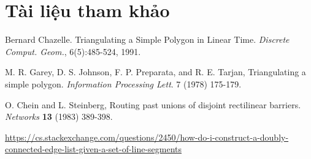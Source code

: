 \section{Tài liệu tham khảo}
\begin{thebibliography}{9}
    Bernard Chazelle. Triangulating a Simple Polygon in Linear Time. \textit{Discrete Comput. Geom.}, 6(5):485-524, 1991.

    M. R. Garey, D. S. Johnson, F. P. Preparata, and R. E. Tarjan, Triangulating a simple polygon. \textit{Information Processing Lett}. 7 (1978) 175-179.

    O. Chein and L. Steinberg, Routing past unions of disjoint rectilinear barriers. \textit{Networks} \textbf{13} (1983) 389-398.

    \href{https://cs.stackexchange.com/questions/2450/how-do-i-construct-a-doubly-connected-edge-list-given-a-set-of-line-segments}{https://cs.stackexchange.com/questions/2450/how-do-i-construct-a-doubly-connected-edge-list-given-a-set-of-line-segments}
    
\end{thebibliography}
